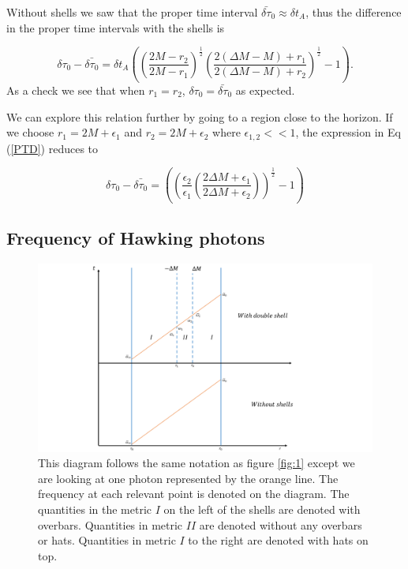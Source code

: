 \documentclass[aps,showpacs,twocolumn,floats,prd,superscriptaddress,nofootinbib]{revtex4-1}
\begin{document}

Without shells we saw that the proper time interval $\bar{\delta \tau}_0 \approx \delta t_A$, thus the difference in the proper time intervals with the shells is

\begin{equation}
	\delta \tau_0 - \bar{\delta \tau_0} = \delta t_A \left( \left( \frac{2M - r_2}{2M - r_1} \right)^\frac{1}{2} \left( \frac{ 2(\Delta M - M) + r_1}{2(\Delta M - M) + r_2} \right)^\frac{1}{2} - 1 \right). 	\label{PTD}
\end{equation}
As a check we see that when $r_1 = r_2$, $\delta \tau_0 = \bar{\delta \tau}_0$ as expected. 

We can explore this relation further by going to a region close to the horizon. If we choose $r_1 = 2M + \epsilon_1$ and $r_2 = 2M + \epsilon_2$ where $\epsilon_{1,2} <<1$, the expression in Eq (\ref{PTD}) reduces to 

\begin{equation}
	\delta \tau_0 - \bar{\delta \tau_0} = \left( \left( \frac{\epsilon_2}{\epsilon_1} \left( \frac{2\Delta M + \epsilon_1}{2 \Delta M + \epsilon_2}\right) \right)^\frac{1}{2} - 1 \right) 
\end{equation}

\subsection{Frequency of Hawking photons}

\begin{figure}[h!]
\begin{center}
\includegraphics[scale = 0.6]{frequency.pdf}
\caption{This diagram follows the same notation as figure \ref{fig:1} except we are looking at one photon represented by the orange line. The frequency at each relevant point is denoted on the diagram. The quantities in the metric $I$ on the left of the shells are denoted with overbars. Quantities in metric $II$ are denoted without any overbars or hats. Quantities in metric $I$ to the right are denoted with hats on top.}
\label{fig:2}
\end{center}
\end{figure}
\end{document}
